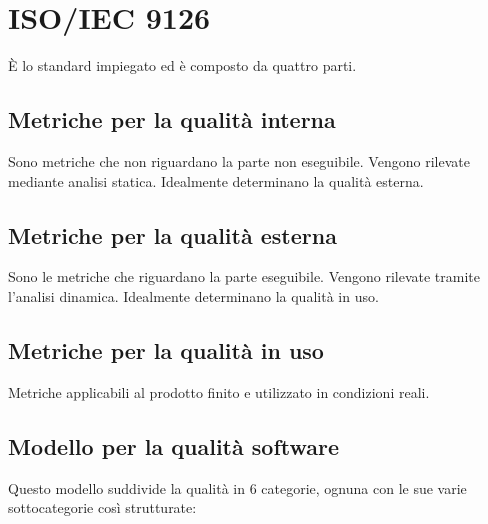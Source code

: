 \label{sec:A}
\section{ISO/IEC 9126}
È lo standard impiegato ed è composto da quattro parti.
\subsection{Metriche per la qualità interna}
Sono metriche che non riguardano la parte non eseguibile. Vengono rilevate mediante analisi statica. Idealmente determinano la qualità esterna.
\subsection{Metriche per la qualità esterna}
Sono le metriche che riguardano la parte eseguibile. Vengono rilevate tramite l'analisi dinamica. Idealmente determinano la qualità in uso.
\subsection{Metriche per la qualità in uso}
Metriche applicabili al prodotto finito e utilizzato in condizioni reali.
\subsection{Modello per la qualità software}
Questo modello suddivide la qualità in 6 categorie, ognuna con le sue varie sottocategorie così strutturate:

